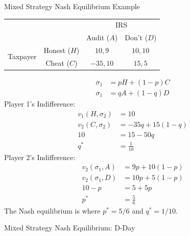 \documentclass[8pt]{extarticle}
\begin{document}
  \begin{problem}{Mixed Strategy Nash Equilibrium Example}
    \begin{center}
      \renewcommand{\arraystretch}{1.5}
      \begin{tabular}{cc|c|c|}
        \multicolumn{1}{c}{}&\multicolumn{1}{c}{}&\multicolumn{2}{c}{IRS}\\
                            &\multicolumn{1}{c}{}&\multicolumn{1}{c}{Audit ($A$)} & \multicolumn{1}{c}{Don't ($D$)}\\
        \cline{3-4}
        \multirow{2}{4em}{Taxpayer} & Honest ($H$) & $10,9$ & $10,10$ \\
        \cline{3-4}
                                    & Cheat ($C$) & $-35,10$ & $15,5$\\
        \cline{3-4}
      \end{tabular}
    \end{center}
    \begin{align*}
      \sigma_1 &= pH + (1-p) C\\
      \sigma_1 &= qA + (1-q) D
    \end{align*}
    Player 1's Indifference:
    \begin{align*}
      v_1(H,\sigma_2) &= 10\\
      v_2(C,\sigma_2) &= -35q + 15(1-q)\\
      10 &= 15-50q\tag*{when taxpayer will be indifferent}\\
      q^* &= \frac{1}{10}
    \end{align*}
    Player 2's Indifference:
    \begin{align*}
      v_2(\sigma_1,A) &= 9p + 10(1-p)\\
      v_2(\sigma_1,D) &= 10p + 5(1-p)\\
      10-p &= 5+5p \\
      p^* &= \frac{5}{6}
    \end{align*}
    The Nash equilibrium is where $p^* = 5/6$ and $q^* = 1/10$.
  \end{problem}
  \begin{problem}{Mixed Strategy Nash Equilibrium: D-Day}
    \begin{tcbraster}[raster columns = 1,colframe = black!75!white,colback=white]
    \end{tcbraster}
  \end{problem}
\end{document}
